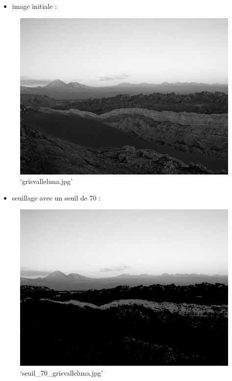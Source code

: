 \documentclass[11pt]{article}
\makeatletter
\def\maxwidth{\ifdim\Gin@nat@width>\linewidth\linewidth
    \else\Gin@nat@width\fi}
\let\Oldincludegraphics\includegraphics
\renewcommand{\includegraphics}[1]{\Oldincludegraphics[width=.8\maxwidth]{#1}}
\providecommand{\tightlist}{%
      \setlength{\itemsep}{0pt}\setlength{\parskip}{0pt}}
\makeatother
\begin{document}
    \begin{itemize}
\tightlist
\item
  image initiale :
\end{itemize}

\begin{figure}
\centering
\includegraphics{grisvalleluna.jpg}
\caption{`grisvalleluna.jpg'}
\end{figure}

\begin{itemize}
\tightlist
\item
  seuillage avec un seuil de \(70\) :
\end{itemize}

\begin{figure}
\centering
\includegraphics{seuil_70_grisvalleluna.jpg}
\caption{`seuil\_70\_grisvalleluna.jpg'}
\end{figure}
\end{document}
